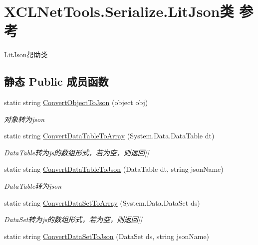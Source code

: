 \hypertarget{class_x_c_l_net_tools_1_1_serialize_1_1_lit_json}{}\section{X\+C\+L\+Net\+Tools.\+Serialize.\+Lit\+Json类 参考}
\label{class_x_c_l_net_tools_1_1_serialize_1_1_lit_json}


Lit\+Json帮助类  


\subsection*{静态 Public 成员函数}
\begin{DoxyCompactItemize}
\item 
static string \hyperlink{class_x_c_l_net_tools_1_1_serialize_1_1_lit_json_a81a2b398d509a227753a98e12a79674e}{Convert\+Object\+To\+Json} (object obj)
\begin{DoxyCompactList}\small\item\em 对象转为json \end{DoxyCompactList}\item 
static string \hyperlink{class_x_c_l_net_tools_1_1_serialize_1_1_lit_json_a8bd51fdf8d1e56bee3e72c165f4d34ae}{Convert\+Data\+Table\+To\+Array} (System.\+Data.\+Data\+Table dt)
\begin{DoxyCompactList}\small\item\em Data\+Table转为js的数组形式，若为空，则返回\mbox{[}\mbox{]} \end{DoxyCompactList}\item 
static string \hyperlink{class_x_c_l_net_tools_1_1_serialize_1_1_lit_json_a118c20cd6f5a519aa5061f1d95f13c94}{Convert\+Data\+Table\+To\+Json} (Data\+Table dt, string json\+Name)
\begin{DoxyCompactList}\small\item\em Data\+Table转为json \end{DoxyCompactList}\item 
static string \hyperlink{class_x_c_l_net_tools_1_1_serialize_1_1_lit_json_a62018ecad0868724f8c525f6633c2db1}{Convert\+Data\+Set\+To\+Array} (System.\+Data.\+Data\+Set ds)
\begin{DoxyCompactList}\small\item\em Data\+Set转为js的数组形式，若为空，则返回\mbox{[}\mbox{]} \end{DoxyCompactList}\item 
static string \hyperlink{class_x_c_l_net_tools_1_1_serialize_1_1_lit_json_afe0e32c9376fb1c7f2c222eb8cfdcc18}{Convert\+Data\+Set\+To\+Json} (Data\+Set ds, string json\+Name)

\end{DoxyCompactItemize}
